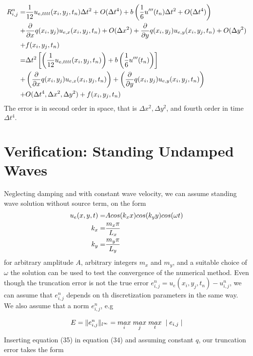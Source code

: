\documentclass[twoside]{article}
\begin{document}
\begin{align} \notag
R_{i,j}^{n} =& \frac{1}{12}u_{e,tttt}(x_{i},y_{j},t_{n})\Delta t^{2}+O(\Delta t^{4}) +b\left(\frac{1}{6}u'''(t_{n})\Delta t^{2}+O(\Delta t^{4})\right) \\ \notag
+& \frac{\partial}{\partial x}q(x_{i},y_{j})u_{e,x}(x_{i},y_{j},t_{n})+O(\Delta x^{2})+\frac{\partial}{\partial y}q(x_{i},y_{j})u_{e,y}(x_{i},y_{j},t_{n})+O(\Delta y^{2}) \\ \notag
+& f(x_{i},y_{j},t_{n}) \\
=& \Delta t^{2}\left[\left(\frac{1}{12}u_{e,tttt}(x_{i},y_{j},t_{n})\right)+b\left(\frac{1}{6}u'''(t_{n})\right)\right] \\ \notag
+&\left(\frac{\partial}{\partial x}q(x_{i},y_{j})u_{e,x}(x_{i},y_{j},t_{n})\right)+\left(\frac{\partial}{\partial y}q(x_{i},y_{j})u_{e,y}(x_{i},y_{j},t_{n})\right)  \\ \notag
+& O(\Delta t^{4},\Delta x^{2},\Delta y^{2}) + f(x_{i},y_{j},t_{n})
\end{align}
The error is in second order in space, that is $\Delta x^{2},\Delta y^{2}$, and fourth order in time $\Delta t^{4}$. 



\section{Verification: Standing Undamped Waves}

Neglecting damping and with constant wave velocity, we can assume
standing wave solution without source term, on the form 
\begin{align}
u_{e}(x,y,t) =& Acos(k_{x}x)cos(k_{y}y)cos(\omega t) \\ \notag
k_{x} =&\frac{m_{x}\pi}{L_{x}} \\ \notag
k_{y} =& \frac{m_{y}\pi}{L_{y}} 
\end{align}
for arbitrary amplitude $A$, arbitrary integers $m_{x}$ and $m_{y}$,
and a suitable choice of $\omega$ the solution can be used to test
the convergence of the numerical method. Even though the truncation
error is not the true error $e_{i,j}^{n}=u_{e}(x_{i},y_{j},t_{n})-u_{i,j}^{n}$,
we can assume that $e_{i,j}^{n}$ depends on th discretization parameters
in the same way. We also assume that a norm $e_{i,j}^{n}$, e.g

\[
E=\Vert e_{i,j}^{n}\Vert_{l^{\infty}}=\underset{i}{max}\hspace{1mm}\underset{j}{max}\hspace{1mm}\underset{t}{max}\hspace{1mm}\mid e_{i,j}\mid
\]
Inserting equation (35) in equation (34) and assuming constant $q$, our truncation
error takes the form 
\end{document}
